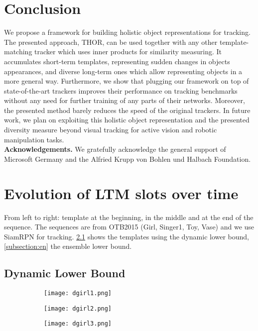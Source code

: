 \documentclass{article}
\begin{document}
\section{Conclusion}
We propose a framework for building holistic object representations for tracking. The presented approach, THOR, can be used together with any other template-matching tracker which uses inner products for similarity measuring. It accumulates short-term templates, representing sudden changes in objects appearances, and diverse long-term ones which allow representing objects in a more general way. 
Furthermore, we show that plugging our framework on top of state-of-the-art trackers improves their performance on tracking benchmarks without any need for further training of any parts of their networks. Moreover, the presented method barely reduces the speed of the original trackers. In future work, we plan on exploiting this holistic object representation and the presented diversity measure beyond visual tracking for active vision and robotic manipulation tasks.\\

\noindent
\textbf{Acknowledgements.} We gratefully acknowledge the general support of Microsoft Germany and the Alfried Krupp von Bohlen und Halbach Foundation.

{}

\pagebreak
\appendix
\section{Evolution of LTM slots over time}

From left to right: template at the beginning, in the middle and at the end of the sequence. The sequences are from OTB2015 (Girl, Singer1, Toy, Vase) and we use SiamRPN for tracking. \ref{subsection:dyn} shows the templates using the dynamic lower bound, \ref{subsection:en} the ensemble lower bound.


\subsection{Dynamic Lower Bound}\label{subsection:dyn}
\begin{figure}[!htb]
    \centering
    \begin{subfigure}{0.3\textwidth}
        \centering
        \texttt{[image: dgirl1.png]}
    \end{subfigure}
    \begin{subfigure}{0.3\textwidth}
        \centering
        \texttt{[image: dgirl2.png]}
    \end{subfigure}
    \begin{subfigure}{0.3\textwidth}
        \centering
        \texttt{[image: dgirl3.png]}
    \end{subfigure}
\end{figure}
\end{document}
